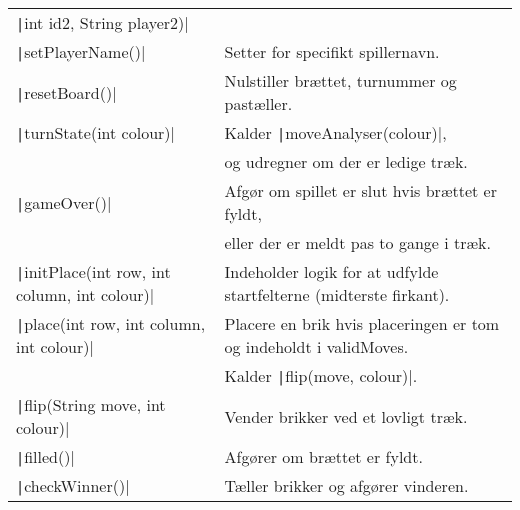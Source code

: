 \begin{table}[H]
\begin{tabular}{ll}
        \quad \texttt|int id2, String player2)|             &                                                                                      \\
        \texttt|setPlayerName()|                            & Setter for specifikt spillernavn.                                                    \\
        \texttt|resetBoard()|                               & Nulstiller brættet, turnummer og pastæller.                                          \\
        \texttt|turnState(int colour)|                      & Kalder \texttt|moveAnalyser(colour)|,                                      \\
                                                                      & og udregner om der er ledige træk.                                                   \\
        \texttt|gameOver()|                                 & Afgør om spillet er slut hvis brættet er fyldt,                                      \\
                                                                      & eller der er meldt pas to gange i træk.                                              \\
        \texttt|initPlace(int row, int column, int colour)| & Indeholder logik for at udfylde startfelterne (midterste firkant).                   \\
        \texttt|place(int row, int column, int colour)|     & Placere en brik hvis placeringen er tom og indeholdt i validMoves.                   \\
                                                                      & Kalder \texttt|flip(move, colour)|.                                        \\
        \texttt|flip(String move, int colour)|              & Vender brikker ved et lovligt træk.                                                  \\
        \texttt|filled()|                                   & Afgører om brættet er fyldt.                                                         \\
        \texttt|checkWinner()|                              & Tæller brikker og afgører vinderen.                                                  \\

\end{tabular}
\end{table}

